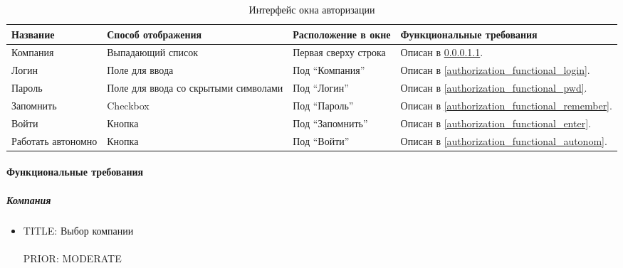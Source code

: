           \begin{table}[h]
            \begin{center}
            \caption {Интерфейс окна авторизации}
            \label{authorization_interface}
            \setlength{\extrarowheight}{2mm}
              \begin{tabular}{|p{4cm}|p{3cm}|p{4cm}|p{4cm}|}
                \hline     \textbf{Название}&\textbf{Способ отображения}&\textbf{Расположение в окне}&\textbf{Функциональные требования} \\ [2mm]

                \hline   Компания & Выпадающий список & Первая сверху строка & Описан в \ref{authorization_functional_company}.\\ [2mm]

                \hline   Логин & Поле для ввода & Под “Компания” & Описан в \ref{authorization_functional_login}. \\ [2mm]

                \hline   Пароль & Поле для ввода со скрытыми символами & Под “Логин” & Описан в \ref{authorization_functional_pwd}. \\ [2mm]

                \hline   Запомнить & Checkbox & Под “Пароль” & Описан в \ref{authorization_functional_remember}. \\ [2mm]

                \hline   Войти & Кнопка & Под “Запомнить” & Описан в \ref{authorization_functional_enter}. \\ [2mm]

                \hline   Работать автономно & Кнопка & Под “Войти” & Описан в \ref{authorization_functional_autonom}. \\ [2mm]

                \hline
              \end{tabular}
            \end{center}
          \end{table}

        \paragraph{Функциональные требования} 
          
          \subparagraph{Компания} \label{authorization_functional_company}

            \begin{itemize}
              \item{
                TITLE: Выбор компании\\
                \\
                PRIOR: MODERATE\\}
            \end{itemize}

